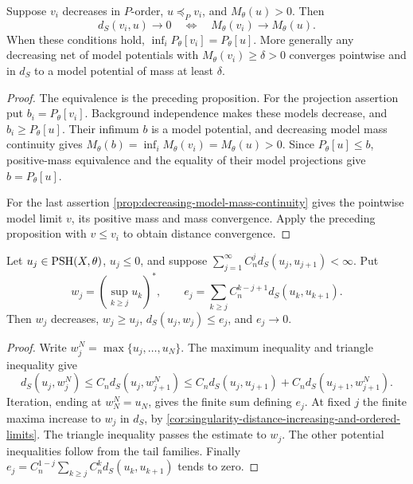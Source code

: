 \begin{corollary}\label{cor:singularity-decreasing-positive-model-limits}
Suppose $v_i$ decreases in $P$-order, $u\preceq_P v_i$, and $M_\theta(u)>0$. Then
\[
 d_S(v_i,u)\to0\quad\Longleftrightarrow\quad
                         M_\theta(v_i)\to M_\theta(u).
\]
When these conditions hold, $\inf_iP_\theta[v_i]=P_\theta[u]$.
More generally any decreasing net of model potentials with $M_\theta(v_i)\geq\delta>0$ converges pointwise and in $d_S$ to a model potential of mass at least $\delta$.
\end{corollary}
\begin{proof}
The equivalence is the preceding proposition. For the projection assertion put $b_i=P_\theta[v_i]$. Background independence makes these models decrease, and $b_i\geq P_\theta[u]$. Their infimum $b$ is a model potential, and decreasing model mass continuity gives
$M_\theta(b)=\inf_iM_\theta(v_i)=M_\theta(u)>0$. Since $P_\theta[u]\leq b$, positive-mass equivalence and the equality of their model projections give $b=P_\theta[u]$.

For the last assertion \cref{prop:decreasing-model-mass-continuity} gives the pointwise model limit $v$, its positive mass and mass convergence. Apply the preceding proposition with $v\leq v_i$ to obtain distance convergence.
\end{proof}

\begin{lemma}\label{lem:singularity-fast-upper-envelopes}
Let $u_j\in\mathrm{PSH}(X,\theta)$, $u_j\leq0$, and suppose
$\sum_{j=1}^\infty C_n^j d_S(u_j,u_{j+1})<\infty$. Put
\[
 w_j=(\sup_{k\geq j}u_k)^*,\qquad
 e_j=\sum_{k\geq j}C_n^{k-j+1}d_S(u_k,u_{k+1}).
\]
Then $w_j$ decreases, $w_j\geq u_j$, $d_S(u_j,w_j)\leq e_j$, and $e_j\to0$.
\end{lemma}
\begin{proof}
Write $w_j^N=\max\{u_j,\ldots,u_N\}$. The maximum inequality and triangle inequality give
\[
 d_S(u_j,w_j^N)
 \leq C_n d_S(u_j,w_{j+1}^N)
 \leq C_n d_S(u_j,u_{j+1})+C_n d_S(u_{j+1},w_{j+1}^N).
\]
Iteration, ending at $w_N^N=u_N$, gives the finite sum defining $e_j$. At fixed $j$ the finite maxima increase to $w_j$ in $d_S$, by \cref{cor:singularity-distance-increasing-and-ordered-limits}. The triangle inequality passes the estimate to $w_j$. The other potential inequalities follow from the tail families. Finally $e_j=C_n^{1-j}\sum_{k\geq j}C_n^k d_S(u_k,u_{k+1})$ tends to zero.
\end{proof}


